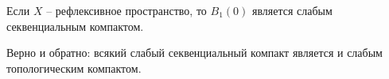 \begin{corollary}
    Если $X$ -- рефлексивное пространство, то $B_1(0)$ является слабым секвенциальным компактом.
\end{corollary}
\begin{note}
    Верно и обратно: всякий слабый секвенциальный компакт является и слабым топологическим компактом.
\end{note}
